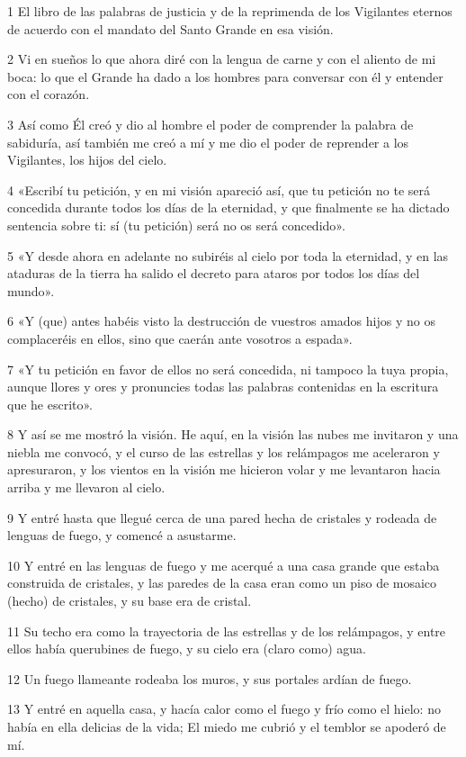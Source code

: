 \par 1 El libro de las palabras de justicia y de la reprimenda de los Vigilantes eternos de acuerdo con el mandato del Santo Grande en esa visión.
\par 2 Vi en sueños lo que ahora diré con la lengua de carne y con el aliento de mi boca: lo que el Grande ha dado a los hombres para conversar con él y entender con el corazón.
\par 3 Así como Él creó y dio al hombre el poder de comprender la palabra de sabiduría, así también me creó a mí y me dio el poder de reprender a los Vigilantes, los hijos del cielo.
\par 4 «Escribí tu petición, y en mi visión apareció así, que tu petición no te será concedida durante todos los días de la eternidad, y que finalmente se ha dictado sentencia sobre ti: sí (tu petición) será no os será concedido».
\par 5 «Y desde ahora en adelante no subiréis al cielo por toda la eternidad, y en las ataduras de la tierra ha salido el decreto para ataros por todos los días del mundo».
\par 6 «Y (que) antes habéis visto la destrucción de vuestros amados hijos y no os complaceréis en ellos, sino que caerán ante vosotros a espada».
\par 7 «Y tu petición en favor de ellos no será concedida, ni tampoco la tuya propia, aunque llores y ores y pronuncies todas las palabras contenidas en la escritura que he escrito».
\par 8 Y así se me mostró la visión. He aquí, en la visión las nubes me invitaron y una niebla me convocó, y el curso de las estrellas y los relámpagos me aceleraron y apresuraron, y los vientos en la visión me hicieron volar y me levantaron hacia arriba y me llevaron al cielo.
\par 9 Y entré hasta que llegué cerca de una pared hecha de cristales y rodeada de lenguas de fuego, y comencé a asustarme.
\par 10 Y entré en las lenguas de fuego y me acerqué a una casa grande que estaba construida de cristales, y las paredes de la casa eran como un piso de mosaico (hecho) de cristales, y su base era de cristal.
\par 11 Su techo era como la trayectoria de las estrellas y de los relámpagos, y entre ellos había querubines de fuego, y su cielo era (claro como) agua.
\par 12 Un fuego llameante rodeaba los muros, y sus portales ardían de fuego.
\par 13 Y entré en aquella casa, y hacía calor como el fuego y frío como el hielo: no había en ella delicias de la vida; El miedo me cubrió y el temblor se apoderó de mí.
